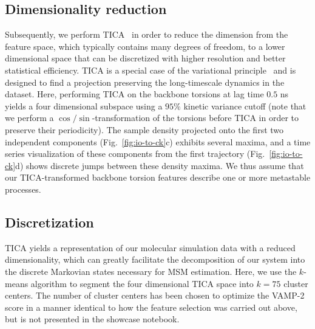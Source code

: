 \documentclass[9pt,tutorial]{livecoms}
\begin{document}
\subsection{Dimensionality reduction}

Subsequently, we perform TICA~\cite{tica,kinetic-maps} in order to reduce the dimension from the feature space, which typically contains many degrees of freedom, to a lower dimensional space that can be discretized with higher resolution and better statistical efficiency. TICA is a special case of the variational principle~\cite{noe-vac,nueske-vamk} and is designed to find a projection preserving the long-timescale dynamics in the dataset. Here, performing TICA on the backbone torsions at lag time $0.5$ ns yields a four dimensional subspace using a $95\%$ kinetic variance cutoff (note that we perform a $\cos/\sin$-transformation of the torsions before TICA in order to preserve their periodicity).
The sample density projected onto the first two independent components (Fig.~\ref{fig:io-to-ck}c) exhibits several maxima, and a time series visualization of these components from the first trajectory (Fig.~\ref{fig:io-to-ck}d) shows discrete jumps between these density maxima.
We thus assume that our TICA-transformed backbone torsion features describe one or more metastable processes.

\subsection{Discretization}
TICA yields a representation of our molecular simulation data with a reduced dimensionality, which can greatly facilitate the decomposition of our system into the discrete Markovian states necessary for MSM estimation. Here, we use the $k$-means algorithm to segment the four dimensional TICA space into $k=75$ cluster centers. The number of cluster centers has been chosen to optimize the VAMP-2 score in a manner identical to how the feature selection was carried out above, but is not presented in the showcase notebook.
\end{document}
